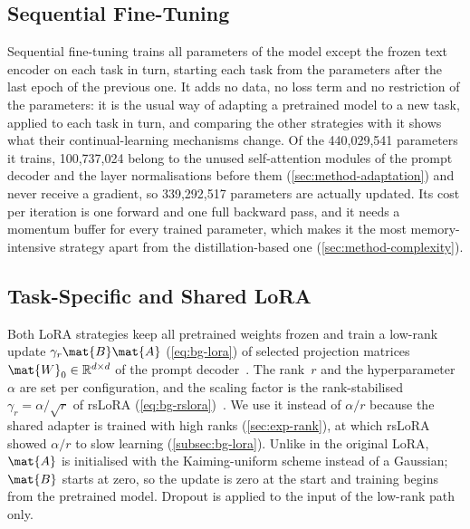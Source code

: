 \subsection{Sequential Fine-Tuning}
\label{subsec:method-seqft}

Sequential fine-tuning trains all parameters of the model except the frozen text encoder on each task in turn, starting each task from the parameters after the last epoch of the previous one.
It adds no data, no loss term and no restriction of the parameters: it is the usual way of adapting a pretrained model to a new task, applied to each task in turn, and comparing the other strategies with it shows what their continual-learning mechanisms change.
Of the 440{,}029{,}541 parameters it trains, 100{,}737{,}024 belong to the unused self-attention modules of the prompt decoder and the layer normalisations before them (\cref{sec:method-adaptation}) and never receive a gradient, so 339{,}292{,}517 parameters are actually updated.
Its cost per iteration is one forward and one full backward pass, and it needs a momentum buffer for every trained parameter, which makes it the most memory-intensive strategy apart from the distillation-based one (\cref{sec:method-complexity}).

\subsection{Task-Specific and Shared LoRA}
\label{subsec:method-lora}

Both LoRA strategies keep all pretrained weights frozen and train a low-rank update $\gamma_r\mat{B}\mat{A}$ (\cref{eq:bg-lora}) of selected projection matrices $\mat{W}_0 \in \mathbb{R}^{d \times d}$ of the prompt decoder~\cite{hu2022lora}.
The rank~$r$ and the hyperparameter~$\alpha$ are set per configuration, and the scaling factor is the rank-stabilised $\gamma_r = \alpha / \sqrt{r}$ of rsLoRA (\cref{eq:bg-rslora})~\cite{kalajdzievski2023rankstabilizationscalingfactor}.
We use it instead of $\alpha / r$ because the shared adapter is trained with high ranks (\cref{sec:exp-rank}), at which rsLoRA showed $\alpha / r$ to slow learning (\cref{subsec:bg-lora}).
Unlike in the original LoRA, $\mat{A}$ is initialised with the Kaiming-uniform scheme instead of a Gaussian; $\mat{B}$ starts at zero, so the update is zero at the start and training begins from the pretrained model.
Dropout is applied to the input of the low-rank path only.

